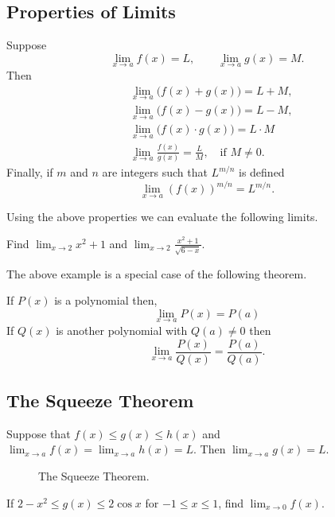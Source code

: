 \documentclass[../main.tex]{subfiles}
\begin{document}
\subsection*{Properties of Limits}
\begin{theorem}
  Suppose
  \[
  \lim_{x\to a}f(x)=L, \qquad \lim_{x\to a}g(x)=M.
  \]
  Then
  \begin{align}
    & \lim_{x\to a}\bigl(f(x)+g(x)\bigr)=L+M,  \\
    & \lim_{x\to a}\bigl(f(x)-g(x)\bigr)= L - M,  \\
    & \lim_{x\to a}\bigl(f(x)\cdot g(x)\bigr)= L\cdot M \\
    & \lim_{x\to a}\frac{f(x)}{g(x)}= \frac{L}{M}, \quad \text{if } M \neq 0.
  \end{align}
  Finally, if $m$ and $n$ are integers such that $L^{m/n}$ is defined
  \begin{equation}
    \lim_{x\to a}(f(x))^{m/n}= L^{m/n}.
  \end{equation}
\end{theorem}

Using the above properties we can evaluate the following limits.
\begin{example}
  Find $\lim_{x \to 2} x^2 +1$ and $\lim_{x \to 2} \frac{x^2+1}{\sqrt{6-x}}$.
\end{example}

The above example is a special case of the following theorem.
\begin{theorem}
  If $P(x)$ is a polynomial then,
  \[
    \lim_{x \to a} P(x) = P(a)
  \]
  If $Q(x)$ is another polynomial with $Q(a) \neq 0$ then
  \[
    \lim_{x \to a} \frac{P(x)}{Q(x)} = \frac{P(a)}{Q(a)}.
  \]
\end{theorem}

\subsection*{The Squeeze Theorem}

\begin{theorem}
  Suppose that $f(x) \le g(x) \le h(x)$ and $\lim_{x \to a} f(x) = \lim_{x \to a} h(x) = L$. Then $\lim_{x \to a} g(x) = L$.
  \begin{figure}[H]
    \centering
    
    \caption{The Squeeze Theorem.}
  \end{figure}
\end{theorem}

\begin{example}
  If $2-x^2 \le g(x) \le 2 \cos x$ for $-1\le x \le 1$, find $\lim_{x \to 0}f(x)$.
\end{example}
\end{document}
